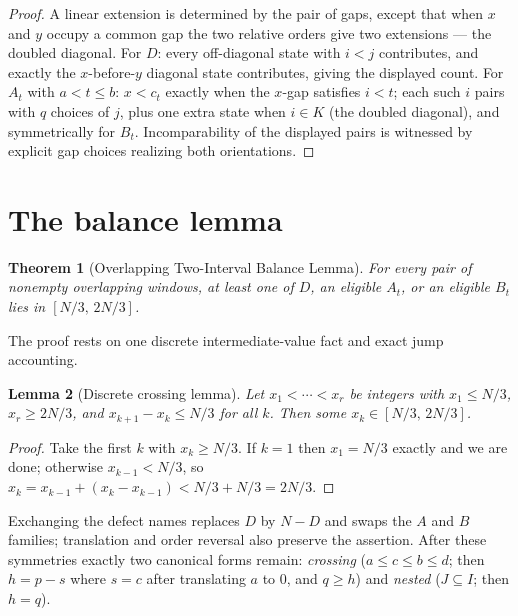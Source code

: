 \documentclass[11pt]{article}
\newtheorem{theorem}{Theorem}[section]
\newtheorem{lemma}[theorem]{Lemma}
\theoremstyle{definition}
\theoremstyle{remark}
\begin{document}
\begin{proof}
A linear extension is determined by the pair of gaps, except that when $x$ and $y$ occupy
a common gap the two relative orders give two extensions --- the doubled diagonal. For
$D$: every off-diagonal state with $i<j$ contributes, and exactly the $x$-before-$y$
diagonal state contributes, giving the displayed count. For $A_t$ with $a<t\le b$: $x<c_t$
exactly when the $x$-gap satisfies $i<t$; each such $i$ pairs with $q$ choices of $j$,
plus one extra state when $i\in K$ (the doubled diagonal), and symmetrically for $B_t$.
Incomparability of the displayed pairs is witnessed by explicit gap choices realizing both
orientations.
\end{proof}

\section{The balance lemma}
\begin{theorem}[Overlapping Two-Interval Balance Lemma]\label{thm:balance}
For every pair of nonempty overlapping windows, at least one of $D$, an eligible $A_t$,
or an eligible $B_t$ lies in $[N/3,\,2N/3]$.
\end{theorem}

The proof rests on one discrete intermediate-value fact and exact jump accounting.

\begin{lemma}[Discrete crossing lemma]\label{lem:crossing}
Let $x_1<\cdots<x_r$ be integers with $x_1\le N/3$, $x_r\ge 2N/3$, and
$x_{k+1}-x_k\le N/3$ for all $k$. Then some $x_k\in[N/3,\,2N/3]$.
\end{lemma}

\begin{proof}
Take the first $k$ with $x_k\ge N/3$. If $k=1$ then $x_1=N/3$ exactly and we are done;
otherwise $x_{k-1}<N/3$, so $x_k=x_{k-1}+(x_k-x_{k-1})<N/3+N/3=2N/3$.
\end{proof}

Exchanging the defect names replaces $D$ by $N-D$ and swaps the $A$ and $B$ families;
translation and order reversal also preserve the assertion. After these symmetries exactly
two canonical forms remain: \emph{crossing} ($a\le c\le b\le d$; then $h=p-s$ where $s=c$
after translating $a$ to $0$, and $q\ge h$) and \emph{nested} ($J\subseteq I$; then
$h=q$).
\end{document}
